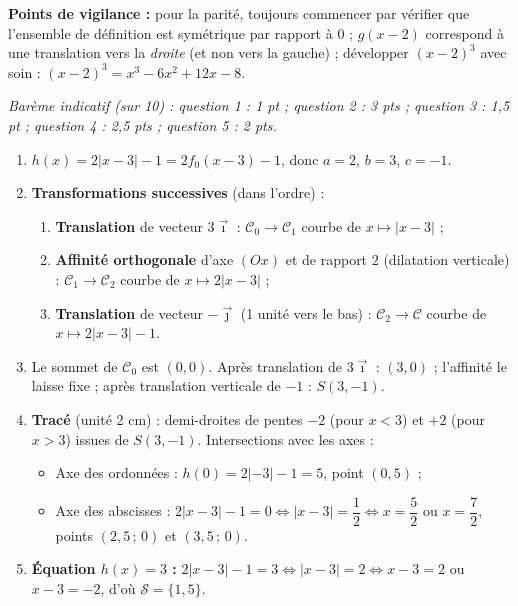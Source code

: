 \documentclass[11pt]{article}
\begin{document}
\begin{corrige}
\begin{enumerate}
    \textbf{Points de vigilance :} pour la parité, toujours commencer par vérifier que l'ensemble de définition est symétrique par rapport à $0$ ; $g(x-2)$ correspond à une translation vers la \emph{droite} (et non vers la gauche) ; développer $(x-2)^3$ avec soin : $(x-2)^3=x^3-6x^2+12x-8$.
\end{enumerate}
\end{corrige}

\begin{corrige}
\emph{Barème indicatif (sur 10) : question 1 : 1 pt ; question 2 : 3 pts ; question 3 : 1,5 pt ; question 4 : 2,5 pts ; question 5 : 2 pts.}
\begin{enumerate}
    \item $h(x)=2|x-3|-1=2f_0(x-3)-1$, donc $a=2$, $b=3$, $c=-1$.
    \item \textbf{Transformations successives} (dans l'ordre) :
    \begin{enumerate}
        \item \textbf{Translation} de vecteur $3\vec{\imath}$ : $\mathcal{C}_0 \to \mathcal{C}_1$ courbe de $x \mapsto |x-3|$ ;
        \item \textbf{Affinité orthogonale} d'axe $(Ox)$ et de rapport $2$ (dilatation verticale) : $\mathcal{C}_1 \to \mathcal{C}_2$ courbe de $x \mapsto 2|x-3|$ ;
        \item \textbf{Translation} de vecteur $-\vec{\jmath}$ (1 unité vers le bas) : $\mathcal{C}_2 \to \mathcal{C}$ courbe de $x \mapsto 2|x-3|-1$.
    \end{enumerate}
    \item Le sommet de $\mathcal{C}_0$ est $(0,0)$. Après translation de $3\vec{\imath}$ : $(3,0)$ ; l'affinité le laisse fixe ; après translation verticale de $-1$ : $\boxed{S(3,-1)}$.
    \item \textbf{Tracé} (unité 2 cm) : demi-droites de pentes $-2$ (pour $x<3$) et $+2$ (pour $x>3$) issues de $S(3,-1)$. Intersections avec les axes :
    \begin{itemize}
        \item Axe des ordonnées : $h(0)=2|{-3}|-1=5$, point $(0,5)$ ;
        \item Axe des abscisses : $2|x-3|-1=0 \iff |x-3|=\dfrac{1}{2} \iff x=\dfrac{5}{2}$ ou $x=\dfrac{7}{2}$, points $(2,5\,;\,0)$ et $(3,5\,;\,0)$.
    \end{itemize}
    \item \textbf{Équation $h(x)=3$ :} $2|x-3|-1=3 \iff |x-3|=2 \iff x-3=2$ ou $x-3=-2$, d'où $\mathcal{S}=\{1,5\}$.
    

\end{enumerate}
\end{corrige}
\end{document}
